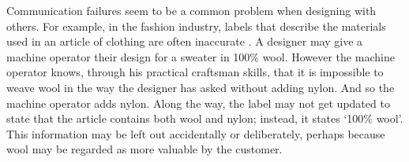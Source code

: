 Communication failures seem to be a common problem when designing with others.
For example, in the fashion industry, labels that describe the materials used in an article of clothing are often inaccurate \citep{Kalkreuter2018}.
A designer may give a machine operator their design for a sweater in 100\% wool.
However the machine operator knows, through his practical craftsman skills, that it is impossible to weave wool in the way the designer has asked without adding nylon.
And so the machine operator adds nylon.
Along the way, the label may not get updated to state that the article contains both wool and nylon; instead, it states `100\% wool'.
This information may be left out accidentally or deliberately, perhaps because wool may be regarded as more valuable by the customer.






